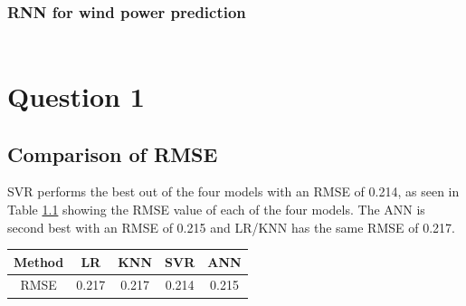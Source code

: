 \documentclass[a4paper, article, oneside, USenglish, IN5460]{memoir}
\begin{document}
\subsection{RNN  for wind power prediction}
\begin{equation}
\begin{aligned}

\end{aligned}
\end{equation}
\newline

\chapter{Question 1}

\section{Comparison of RMSE}
SVR performs the best out of the four models with an RMSE of 0.214, as seen in Table \ref{tab:q1-RMSE-comparison} showing the RMSE value of each of the four models. The ANN is second best with an RMSE of 0.215 and LR/KNN has the same RMSE of 0.217.
\begin{table}[H]
    \centering
    \begin{tabular}{|c|c|c|c|c|} \hline 
        Method & LR & KNN & SVR & ANN\\ \hline 
        RMSE&  0.217&  0.217&  0.214& 0.215\\ \hline
    \end{tabular}
    \label{tab:q1-RMSE-comparison}
\end{table}
\end{document}
